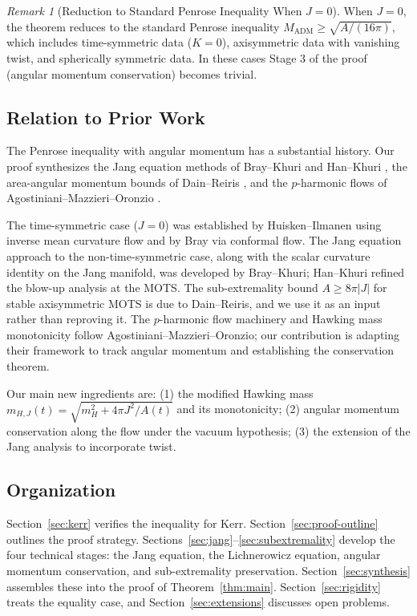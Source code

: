 \documentclass[12pt]{article}
\theoremstyle{plain}
\theoremstyle{definition}
\theoremstyle{remark}
\newtheorem{remark}[theorem]{Remark}
\newcommand{\ADM}{\mathrm{ADM}}
\begin{document}
\begin{remark}[Reduction to Standard Penrose Inequality When $J = 0$]\label{rem:J-zero}
When $J = 0$, the theorem reduces to the standard Penrose inequality $M_{\ADM} \geq \sqrt{A/(16\pi)}$, which includes time-symmetric data ($K=0$), axisymmetric data with vanishing twist, and spherically symmetric data. In these cases Stage 3 of the proof (angular momentum conservation) becomes trivial.
\end{remark}

\subsection{Relation to Prior Work}

The Penrose inequality with angular momentum has a substantial history. Our proof synthesizes the Jang equation methods of Bray--Khuri \cite{braykhuri2010} and Han--Khuri \cite{hankhuri2013}, the area-angular momentum bounds of Dain--Reiris \cite{dain2011}, and the $p$-harmonic flows of Agostiniani--Mazzieri--Oronzio \cite{amo2022}.

The time-symmetric case ($J=0$) was established by Huisken--Ilmanen \cite{huisken2001} using inverse mean curvature flow and by Bray \cite{bray2001} via conformal flow. The Jang equation approach to the non-time-symmetric case, along with the scalar curvature identity on the Jang manifold, was developed by Bray--Khuri; Han--Khuri refined the blow-up analysis at the MOTS. The sub-extremality bound $A \geq 8\pi|J|$ for stable axisymmetric MOTS is due to Dain--Reiris, and we use it as an input rather than reproving it. The $p$-harmonic flow machinery and Hawking mass monotonicity follow Agostiniani--Mazzieri--Oronzio; our contribution is adapting their framework to track angular momentum and establishing the conservation theorem.

Our main new ingredients are: (1) the modified Hawking mass $m_{H,J}(t) = \sqrt{m_H^2 + 4\pi J^2/A(t)}$ and its monotonicity; (2) angular momentum conservation along the flow under the vacuum hypothesis; (3) the extension of the Jang analysis to incorporate twist.

\subsection{Organization}

Section~\ref{sec:kerr} verifies the inequality for Kerr. Section~\ref{sec:proof-outline} outlines the proof strategy. Sections~\ref{sec:jang}--\ref{sec:subextremality} develop the four technical stages: the Jang equation, the Lichnerowicz equation, angular momentum conservation, and sub-extremality preservation. Section~\ref{sec:synthesis} assembles these into the proof of Theorem~\ref{thm:main}. Section~\ref{sec:rigidity} treats the equality case, and Section~\ref{sec:extensions} discusses open problems.
\end{document}
